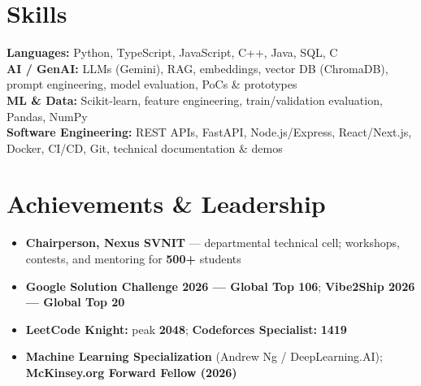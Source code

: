 \documentclass[a4paper,10pt]{article}
\begin{document}
\section{Skills}
\noindent\small
\textbf{Languages:} Python, TypeScript, JavaScript, C++, Java, SQL, C \\[0.6mm]
\textbf{AI / GenAI:} LLMs (Gemini), RAG, embeddings, vector DB (ChromaDB), prompt engineering, model evaluation, PoCs \& prototypes \\[0.6mm]
\textbf{ML \& Data:} Scikit-learn, feature engineering, train/validation evaluation, Pandas, NumPy \\[0.6mm]
\textbf{Software Engineering:} REST APIs, FastAPI, Node.js/Express, React/Next.js, Docker, CI/CD, Git, technical documentation \& demos

\section{Achievements \& Leadership}
\begin{itemize}
  \item \textbf{Chairperson, Nexus SVNIT} --- departmental technical cell; workshops, contests, and mentoring for \textbf{500+} students
  \item \textbf{Google Solution Challenge 2026 --- Global Top 106}; \textbf{Vibe2Ship 2026 --- Global Top 20}
  \item \textbf{LeetCode Knight:} peak \textbf{2048}; \textbf{Codeforces Specialist:} \textbf{1419}
  \item \textbf{Machine Learning Specialization} (Andrew Ng / DeepLearning.AI); \textbf{McKinsey.org Forward Fellow (2026)}
\end{itemize}
\end{document}
